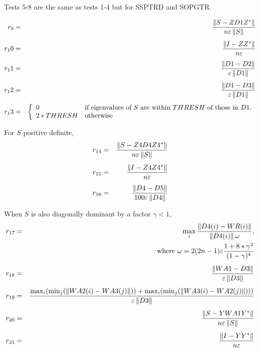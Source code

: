 \dent
Tests 5-8 are the same as tests 1-4 but for SSPTRD and SOPGTR.

\begin{eqnarray}
	r_9&=&\frac{ \left\| S - Z D1 Z^* \right\| }
                   { n \varepsilon \left\| S\right\| } \nonumber\\[1ex]
	r_10&=&\frac{ \left\| I - Z Z^*   \right\| }
                   { n          \varepsilon } \nonumber\\[1ex]
	r_11&=&\frac{ \left\| D1 - D2\right\|}
                   { \varepsilon \left\| D1\right\| } \nonumber\\[1ex]
	r_12&=&\frac{ \left\| D1 - D3\right\|}
                   { \varepsilon \left\| D1\right\| } \nonumber\\[1ex]
	r_13&=& \left\{
              \begin{array}{ll}
                 0 & \mbox{if eigenvalues of $S$ are within $THRESH$ of those
            			 in $D1$.} \\
                 2*THRESH & \mbox{otherwise}
              \end{array} \right.  \nonumber 
\end{eqnarray}

For $S$ positive definite,
\begin{eqnarray}
	r_{14}&=&\frac{ \left\| S - Z4 D4 Z4^* \right\| }
                   { n \varepsilon \left\| S\right\| } \nonumber\\[1ex]
	r_{15}&=&\frac{ \left\| I - Z4 Z4^*   \right\| }
                   { n          \varepsilon } \nonumber\\[1ex]
	r_{16}&=&\frac{ \left\| D4 - D5\right\|}
                   { 100 \varepsilon \left\| D4\right\| } \nonumber
\end{eqnarray}

When $S$ is also diagonally dominant by a factor $\gamma < 1$,
\begin{eqnarray}
        r_{17}&=&\max_i \frac{\left\| D4(i)-WR(i)\right\|}
                        {\left\| D4(i)\right\| \omega}, \nonumber\\
              & &\mbox{where\ }
		 \omega = 2 (2n-1) \varepsilon
		\frac{1+8*\gamma^2}{(1-\gamma)^4} \nonumber\\[1ex]
	r_{18}&=&\frac{ \left\| WA1 - D3\right\|}
                   { \varepsilon \left\| D3\right\| } \nonumber\\[1ex]
        r_{19}&=&\frac{\max_i(\min_j(\left\| WA2(i)-WA3(j)
\right\|))+\max_i(\min_j(\left\| WA3(i)-WA2(j) \right\|)))}
                 {\varepsilon \left\| D3 \right\|} \nonumber\\[1ex]
        r_{20}&=&\frac{\left\| S - Y WA1 Y^* \right\|}
                 {n \varepsilon \left\| S \right\|} \nonumber\\[1ex]
        r_{21}&=&\frac{\left\| I - Y Y^* \right\|}
                 {n \varepsilon} \nonumber
\end{eqnarray}

